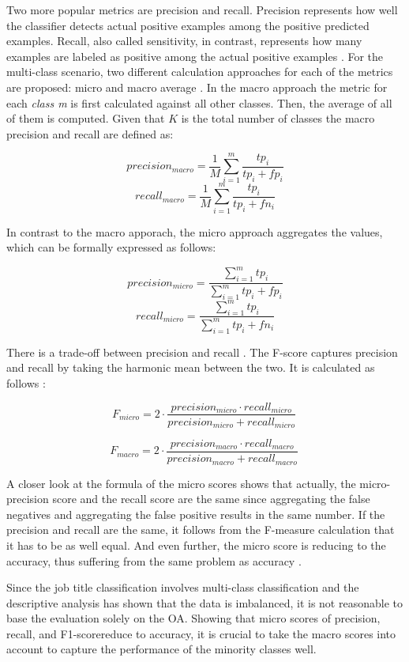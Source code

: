 \documentclass[12pt, a4paper, titlepage]{article}
\begin{document}
Two more popular metrics are precision and recall. Precision represents how well the classifier detects actual positive examples among the positive predicted examples. Recall, also called sensitivity, in contrast, represents how many examples are labeled as positive among the actual positive examples \citep{Berthold2020}. For the multi-class scenario, two different calculation approaches for each of the metrics are proposed: micro and macro average \citep{Branco2017}. In the macro approach the metric for each \textit{class m} is first calculated against all other classes. Then, the average of all of them is computed. Given that $K$ is the total number of classes the macro precision and recall are defined as:

\[precision_{macro} = \frac{1}{M} \sum_{i=1}^m \frac{tp_{i}}{tp_{i} + fp_{i}}\]
\[recall_{macro} = \frac{1}{M} \sum_{i=1}^m \frac{tp_{i}}{tp_{i} + fn_{i}}\]

In contrast to the macro apporach, the micro approach aggregates the values, which can be formally expressed as follows: 

\[precision_{micro} = \frac{\sum_{i=1}^m tp_i}{\sum_{i=1}^m tp_i + fp_i}\]
\[recall_{micro} = \frac{\sum_{i=1}^m tp_i}{\sum_{i=1}^m tp_i + fn_i}\]

There is a trade-off between precision and recall \citep{Buckland1994}. The F-score captures precision and recall by taking the harmonic mean between the two. It is calculated as follows \citep{Branco2017,Pan2016}:  

\[F_{micro} = 2 \cdot \frac{precision_{micro} \cdot recall_{micro} }{precision_{micro} + recall_{micro} }\ \]

\[F_{macro} = 2 \cdot \frac{precision_{macro} \cdot recall_{macro} }{precision_{macro} + recall_{macro} }\ \]

A closer look at the formula of the micro scores shows that actually, the micro-precision score and the recall score are the same since aggregating the false negatives and aggregating the false positive results in the same number. If the precision and recall are the same, it follows from the F-measure calculation that it has to be as well equal. And even further, the micro score is reducing to the accuracy, thus suffering from the same problem as accuracy \citep{grandini2020}.

Since the job title classification involves multi-class classification and the descriptive analysis has shown that the data is imbalanced, it is not reasonable to base the evaluation solely on the \ac{OA}. Showing that micro scores of precision, recall, and F1-scorereduce to accuracy, it is crucial to take the macro scores into account to capture the performance of the minority classes well.
\end{document}
